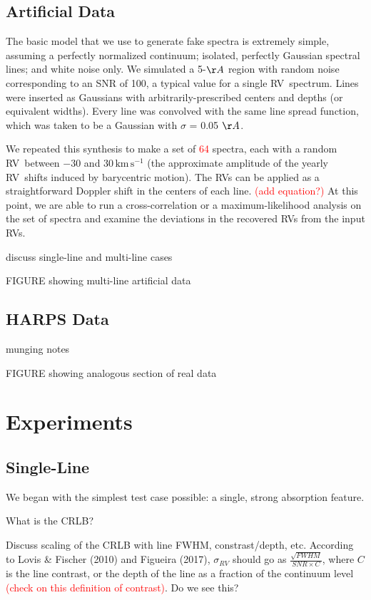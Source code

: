 \documentclass[modern]{aastex61}
\newcommand{\unit}[1]{\mathrm{#1}}
\newcommand{\km}{\unit{km}}
\newcommand{\s}{\unit{s}}
\newcommand{\kms}{\km\,\s^{-1}}
\newcommand\todo[1]{\textcolor{red}{#1}}  %
\newcommand{\acronym}[1]{{\small{#1}}}
\newcommand{\RV}{\acronym{RV}}
\begin{document}
\subsection{Artificial Data}

The basic model that we use to generate fake spectra is extremely simple, assuming a perfectly normalized continuum; isolated, perfectly Gaussian spectral lines; and white noise only. We simulated a 5-$\AA$ region with random noise corresponding to an SNR of 100, a typical value for a single \RV\ spectrum. Lines were inserted as Gaussians with arbitrarily-prescribed centers and depths (or equivalent widths). Every line was convolved with the same line spread function, which was taken to be a Gaussian with $\sigma$ = 0.05 $\AA$. %

We repeated this synthesis to make a set of \todo{64} spectra, each with a random \RV\ between $-30$ and $30\,\kms$ (the approximate amplitude of the yearly \RV\ shifts induced by barycentric motion). The \RV s can be applied as a straightforward Doppler shift in the centers of each line. \todo{(add equation?)} At this point, we are able to run a cross-correlation or a maximum-likelihood analysis on the set of spectra and examine the deviations in the recovered \RV s from the input \RV s.

discuss single-line and multi-line cases

FIGURE showing multi-line artificial data

\subsection{HARPS Data}

munging notes

FIGURE showing analogous section of real data

\section{Experiments}
\label{s:experiments}

\subsection{Single-Line}

We began with the simplest test case possible: a single, strong absorption feature.

What is the CRLB?

Discuss scaling of the CRLB with line FWHM, constrast/depth, etc. According to Lovis \& Fischer (2010) and Figueira (2017), $\sigma_{RV}$ should go as $\frac{\sqrt{FWHM}}{SNR \times C}$, where $C$ is the line contrast, or the depth of the line as a fraction of the continuum level \todo{(check on this definition of contrast)}. Do we see this?
\end{document}
